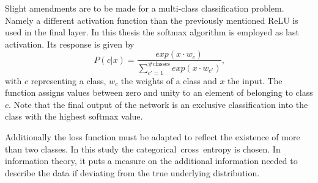 Slight amendments are to be made for a multi-class classification problem. Namely a different activation function than the previously mentioned ReLU is used in the final layer. In this thesis the softmax algorithm is employed as last activation. Its response is given by
\begin{equation}
	P(c | x) = \frac{exp(x \cdot w_c)}{\sum \limits_{c' = 1}^{\#\text{classes}} exp(x \cdot w_{c'})}
	\text{,}
\end{equation}
with $c$ representing a class, $w_c$ the weights of a class and $x$ the input. The function assigns values between zero and unity to an element of belonging to class $c$. Note that the final output of the network is an exclusive classification into the class with the highest softmax value.

Additionally the loss function must be adapted to reflect the existence of more than two classes. In this study the categorical~cross~entropy is chosen. In information theory, it puts a measure on the additional information needed to describe the data if deviating from the true underlying distribution.
